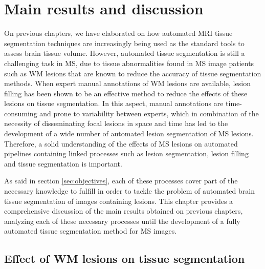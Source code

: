 \chapter{Main results and discussion}


On previous chapters, we have elaborated on how automated MRI tissue segmentation techniques are increasingly being used as the standard tools to assess brain tissue volume. However, automated tissue segmentation is still a challenging task in MS, due to tissue abnormalities found in MS image patients such as WM lesions that are known to reduce the accuracy of tissue segmentation methods. When expert manual annotations of WM lesions are available, lesion filling has been shown to be an effective method to reduce the effects of these lesions on tissue segmentation. In this aspect, manual annotations are time-consuming and prone to variability between experts, which in combination of the necessity of disseminating focal lesions in space and time has led to the development of a wide number of automated lesion segmentation of MS lesions. Therefore, a solid understanding of the effects of MS lesions on automated pipelines containing linked processes such as lesion segmentation, lesion filling and tissue segmentation is important. 

As said in section \ref{sec:objectives}, each of these processes cover part of the necessary knowledge to fulfill in order to tackle the problem of automated brain tissue segmentation of images containing lesions. This chapter provides a comprehensive discussion of the main results obtained on previous chapters, analyzing each of these necessary processes until the development of a fully automated tissue segmentation method for MS images.

\section{Effect of WM lesions on tissue segmentation}

